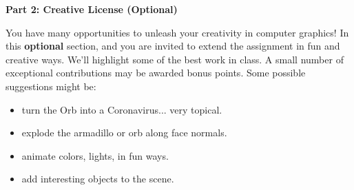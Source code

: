 \documentclass[12pt]{exam}
\begin{document}
\begin{enumerate}






  
\end{enumerate}


{\bf Part 2: Creative License (Optional)}

You have many opportunities to unleash your creativity in
computer graphics!  In this \textbf{optional} section, and you are
invited to extend the assignment in fun and creative ways.
We'll highlight some of the best work in class. A small number of
exceptional contributions may be awarded bonus points.
Some possible suggestions might be:
\begin{itemize}
\item turn the Orb into a Coronavirus... very topical.
\item explode the armadillo or orb along face normals.
\item animate colors, lights, in fun ways. 
\item add interesting objects to the scene.
\end{itemize}
\end{document}
